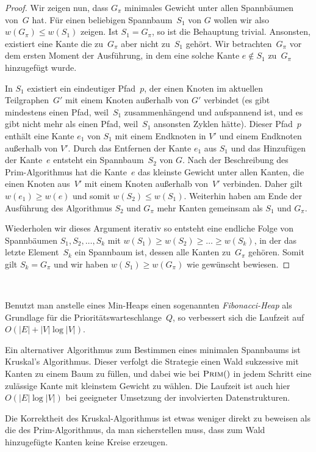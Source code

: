 \begin{proof}
Wir zeigen nun, dass $G_\pi$ minimales Gewicht unter allen Spannbäumen von~$G$ hat.
Für einen beliebigen Spannbaum~$S_1$ von $G$ wollen wir also $w(G_\pi) \le w(S_1)$ zeigen.
Ist $S_1=G_\pi$, so ist die Behauptung trivial. 
Ansonsten, existiert eine Kante die zu~$G_\pi$ aber nicht zu~$S_1$ gehört.
Wir betrachten~$G_\pi$ vor dem ersten Moment der Ausführung, in dem eine solche Kante $e \not\in S_1$ zu~$G_\pi$ hinzugefügt wurde. 
	
In $S_1$ existiert ein eindeutiger Pfad~$p$, der einen Knoten im aktuellen Teilgraphen~$G'$ mit einem Knoten außerhalb von $G'$ verbindet (es gibt mindestens einen Pfad, weil~$S_1$ zusammenhängend und aufspannend ist, und es gibt nicht mehr als einen Pfad, weil~$S_1$ ansonsten Zyklen hätte).
Dieser Pfad~$p$ enthält eine Kante $e_1$ von $S_1$ mit einem Endknoten in $V'$ und einem Endknoten außerhalb von $V'$.
Durch das Entfernen der Kante $e_1$ aus $S_1$ und das Hinzufügen der Kante~$e$ entsteht ein Spannbaum~$S_2$ von $G$. 
Nach der Beschreibung des Prim-Algorithmus hat die Kante~$e$ das kleinste Gewicht unter allen Kanten, die einen Knoten aus~$V'$ mit einem Knoten außerhalb von~$V'$ verbinden.
Daher gilt $w(e_1) \ge w(e)$ und somit $w(S_2) \le w(S_1)$.
Weiterhin haben am Ende der Ausführung des Algorithmus $S_2$ und $G_\pi$ mehr Kanten gemeinsam als $S_1$ und $G_\pi$.

Wiederholen wir dieses Argument iterativ so entsteht eine endliche Folge von Spannbäumen $S_1, S_2,\ldots, S_k$ mit $w(S_1) \ge w(S_2) \ge \ldots \geq w(S_k)$, in der das letzte Element~$S_k$ ein Spannbaum ist, dessen alle Kanten zu~$G_\pi$ gehören.
Somit gilt $S_k=G_\pi$ und wir haben $w(S_1) \ge w(G_\pi)$ wie gewünscht bewiesen.
\end{proof}


\begin{bem}\
\begin{enuma}
 \item Benutzt man anstelle eines Min-Heaps einen sogenannten \emph{Fibonacci-Heap} als Grundlage für die Prioritätswarteschlange~$Q$, so verbessert sich die Laufzeit auf $O(|E|+|V|\log|V|)$.

 \item Ein alternativer Algorithmus zum Bestimmen eines minimalen Spannbaums ist Kruskal's Algorithmus.
Dieser verfolgt die Strategie einen Wald sukzessive mit Kanten zu einem Baum zu füllen, und dabei wie bei $\mathop{\text{\textsc{Prim}}}()$ in jedem Schritt eine zulässige Kante mit kleinstem Gewicht zu wählen.
Die Laufzeit ist auch hier $O(|E|\log|V|)$ bei geeigneter Umsetzung der involvierten Datenstrukturen.

Die Korrektheit des Kruskal-Algorithmus ist etwas weniger direkt zu beweisen als die des Prim-Algorithmus, da man sicherstellen muss, dass zum Wald hinzugefügte Kanten keine Kreise erzeugen.

\end{enuma}
\end{bem}

